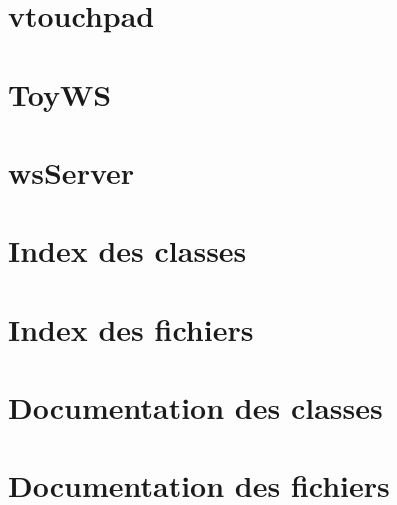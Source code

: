 \let\mypdfximage\pdfximage\def\pdfximage{\immediate\mypdfximage}\documentclass[twoside]{book}
\newcommand{\+}{\discretionary{\mbox{\scriptsize$\hookleftarrow$}}{}{}}
\newcommand{\clearemptydoublepage}{%
  \newpage{\pagestyle{empty}\cleardoublepage}%
}
\begin{document}
\chapter{vtouchpad}
\label{md_lib_wsServer_examples_vtouchpad_README}

\chapter{Toy\+WS}
\label{md_lib_wsServer_extra_toyws_README}

\chapter{ws\+Server}
\label{md_lib_wsServer_README}

\chapter{Index des classes}

\chapter{Index des fichiers}

\chapter{Documentation des classes}














\chapter{Documentation des fichiers}




















\backmatter
\newpage
{}
\clearemptydoublepage
{}
\printindex
\end{document}
